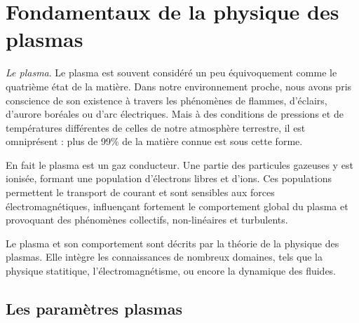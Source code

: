 	\section{Fondamentaux de la physique des plasmas}
		 
		\emph{Le plasma}. Le plasma est souvent considéré un peu équivoquement
		comme le quatrième état de la matière. Dans notre environnement proche,
		nous avons pris conscience de son existence à travers les phénomènes de flammes,
		d'éclairs, d'aurore boréales ou d'arc électriques. Mais à des conditions de
		pressions et de températures différentes de celles de notre atmosphère
		terrestre, il est omniprésent : plus de 99\% de la matière connue est sous
		cette forme. 
		
		En fait le plasma est un gaz conducteur. Une partie des
		particules gazeuses y est ionisée, formant une population
		d'électrons libres et d'ions. Ces populations permettent le transport de
		courant et sont sensibles aux forces électromagnétiques, influençant
		fortement le comportement global du plasma et provoquant des phénomènes
		collectifs, non-linéaires et turbulents.
		
		Le plasma et son comportement sont décrits par la théorie de la physique des
		plasmas. Elle intègre les connaissances de nombreux domaines, tels que la
		physique statitique, l'électromagnétisme, ou encore la dynamique des fluides.
		
		\subsection{Les paramètres plasmas}
		
